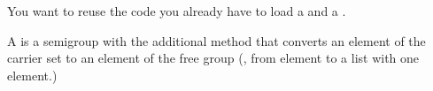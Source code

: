 
\begin{hint}
    You want to reuse the code you already have to load a \FiniteSet and a \FiniteMap.
\end{hint}

\label{sec:free-semigroup}



A \FreeSemigroup is a semigroup with the additional method  that converts an element of the carrier set to an element of the free group (\eg, from element to a list with one element.)

